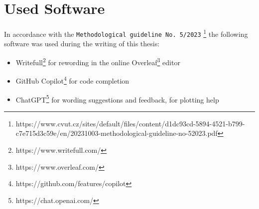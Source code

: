 
\appendix
\renewcommand\chaptername{Appendix}

\renewcommand{\thechapter}{A}
\renewcommand\chaptername{Appendix A}

\chapter{Used Software}

In accordance with the \texttt{Methodological guideline No. 5/2023}
\footnote{https://www.cvut.cz/sites/default/files/content/d1dc93cd-5894-4521-b799-c7e715d3c59e/en/20231003-methodological-guideline-no-52023.pdf}
the following software was used during the writing of this thesis:
\begin{itemize}
    \item {Writefull\footnote{https://www.writefull.com/} for rewording in the online Overleaf\footnote{https://www.overleaf.com/} editor}
    \item {GitHub Copilot\footnote{https://github.com/features/copilot} for code completion}
    \item {ChatGPT\footnote{https://chat.openai.com/} for wording suggestions and feedback, for plotting help}
\end{itemize}